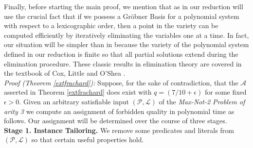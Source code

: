 \documentclass{article}
\begin{document}
Finally, before starting the main proof, we mention that as in \citep{RS} our reduction will use the crucial fact that if we possess a Gr\"{o}bner Basis for a polynomial system with respect to a lexicographic order, then a point in the variety can be computed efficiently by iteratively eliminating the variables one at a time. In fact, our situation will be simpler than in \citep{RS} because the variety of the polynomial system defined in our reduction is finite so that all partial solutions extend during the elimination procedure. These classic results in elimination theory are covered in the textbook of Cox, Little and O'Shea \cite{Cox}.\\

\noindent \textit{Proof (Theorem \ref{extfrachard}):} Suppose, for the sake of contradiction, that the $\mathcal{A}$ asserted in Theorem \ref{extfrachard} does exist with $q=(7/10+\epsilon)$ for some fixed $\epsilon>0$. Given an arbitrary satisfiable input $(\mathcal{P}, \mathcal{L})$ of the \textit{Max-Not-2 Problem of arity 3} we compute an assignment of forbidden quality in polynomial time as follows. Our assignment will be determined over the course of three stages. \\

\noindent \textbf{Stage 1. Instance Tailoring.} We remove some predicates and literals from $(\mathcal{P}, \mathcal{L})$ so that certain useful properties hold. 
\end{document}
